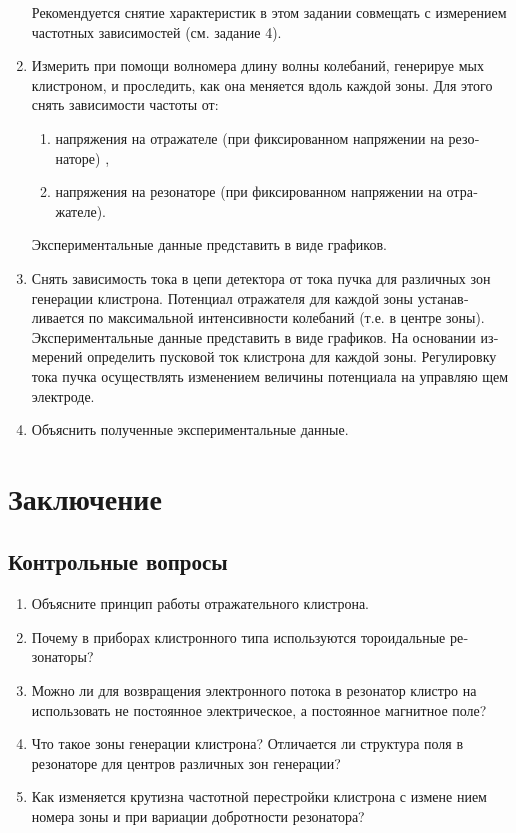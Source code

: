\begin{enumerate}
	Рекомендуется снятие характеристик в этом задании совмещать с изме­рением частотных зависимостей (см. задание 4).

	\item Измерить при помощи волномера длину волны колебаний, генерируе­
	мых клистроном, и проследить, как она меняется вдоль каждой зоны. Для
	этого снять зависимости частоты от:
		\begin{enumerate}
			\item  напряжения на отражателе (при фиксированном напряжении на резо­
			наторе) ,
			\item  напряжения на резонаторе (при фиксированном напряжении на отра­
			жателе).
		\end{enumerate}
	
	Экспериментальные данные представить в виде графиков.

	\item  Снять зависимость тока в цепи детектора от тока пучка для различных
	зон генерации клистрона. Потенциал отражателя для каждой зоны устанав­
	ливается по максимальной интенсивности колебаний (т.е. в центре зоны).
	Экспериментальные данные представить в виде графиков. На основании из­
	мерений определить пусковой ток клистрона для каждой зоны. Регулировку
	тока пучка осуществлять изменением величины потенциала на управляю­
	щем электроде.

	\item  Объяснить полученные экспериментальные данные.

\end{enumerate}

\section{Заключение}
\subsection{Контрольные вопросы}

\begin{enumerate}
	\item Объясните принцип работы отражательного клистрона.
	\item Почему в приборах клистронного типа используются тороидальные ре­
	зонаторы?
	\item Можно ли для возвращения электронного потока в резонатор клистро­
	на использовать не постоянное электрическое, а постоянное магнитное поле?
	\item Что такое зоны генерации клистрона? Отличается ли структура поля
	в резонаторе для центров различных зон генерации?
	\item Как изменяется крутизна частотной перестройки клистрона с измене­
	нием номера зоны и при вариации добротности резонатора?
\end{enumerate}
